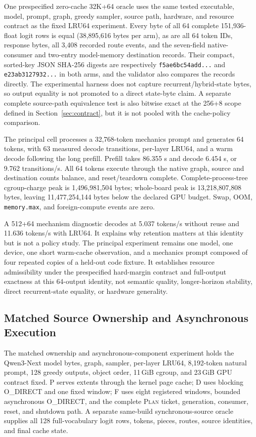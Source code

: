 \documentclass[letterpaper,twocolumn,10pt]{article}
\newcommand{\Plan}{\textsc{Plan}\xspace}
\newcommand{\GiB}{\,GiB\xspace}
\begin{document}
One prespecified zero-cache 32K+64 oracle uses the same tested
executable, model, prompt, graph, greedy sampler, source path, hardware, and
resource contract as the fixed LRU64 experiment.  Every byte of all 64
complete 151,936-float logit rows is equal (38,895,616 bytes per arm), as are
all 64 token IDs, response bytes, all 3,408 recorded route events, and the
seven-field native-consumer and two-entry model-memory destination records.
Their compact, sorted-key JSON SHA-256 digests are respectively
\texttt{f5ae6bc54add...} and \texttt{e23ab3127932...} in both arms, and the
validator also compares the records directly.  The experimental harness does not capture
recurrent/hybrid-state bytes, so output equality is not promoted to a direct
state-byte claim.  A separate complete source-path equivalence test is also
bitwise exact at the 256+8 scope defined in
Section~\ref{sec:contract}, but it is not pooled with the cache-policy comparison.

The principal cell processes a 32,768-token mechanics prompt and generates 64
tokens, with 63 measured decode transitions, per-layer LRU64, and a warm decode
following the long prefill.  Prefill takes 86.355 s and decode 6.454 s, or 9.762
transitions/s.  All 64 tokens execute through the native graph, source and
destination counts balance, and reset/teardown complete.  Complete-process-tree
cgroup-charge peak is
1,496,981,504 bytes; whole-board peak is 13,218,807,808 bytes, leaving
11,477,254,144 bytes below the declared GPU budget.  Swap, OOM,
\texttt{memory.max}, and foreign-compute events are zero.

A 512+64 mechanism diagnostic decodes at 5.037 tokens/s without reuse and
11.636 tokens/s with LRU64.  It explains why retention matters at this identity
but is not a policy study.  The principal experiment remains one model, one device, one
short warm-cache observation, and a mechanics prompt composed of four repeated
copies of a held-out code fixture.  It establishes resource admissibility under
the prespecified hard-margin contract and full-output exactness at this 64-output
identity, not semantic quality, longer-horizon stability, direct recurrent-state
equality, or hardware generality.

\subsection{Matched Source Ownership and Asynchronous Execution}
\label{sec:matchedsource}

The matched ownership and asynchronous-component experiment holds the
Qwen3-Next model bytes, graph, sampler,
per-layer LRU64, 8,192-token natural prompt, 128 greedy outputs, object order,
11\GiB cgroup, and 23\GiB GPU contract fixed.  P serves extents through the
kernel page cache; D uses blocking O\_DIRECT and one fixed window; F uses eight
registered windows, bounded asynchronous O\_DIRECT, and the complete \Plan
ticket, generation, consumer, reset, and shutdown path.  A separate same-build
synchronous-source oracle supplies all 128 full-vocabulary logit rows, tokens,
pieces, routes, source identities, and final cache state.
\end{document}
